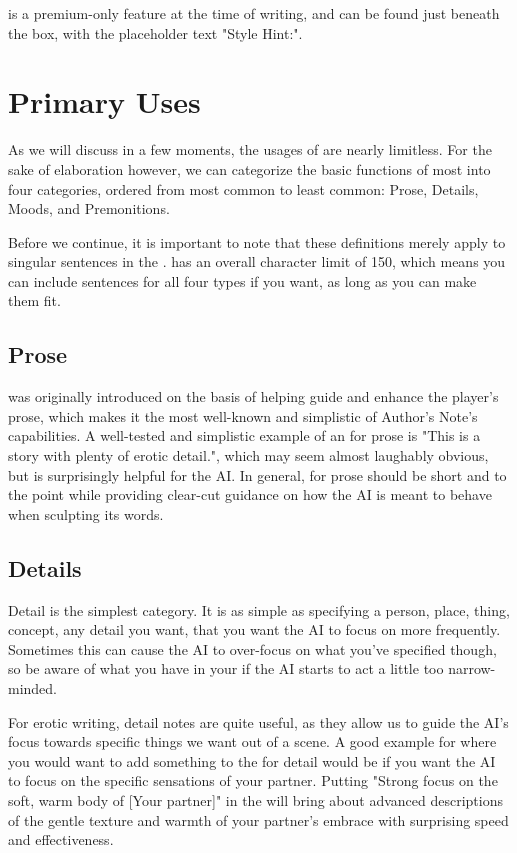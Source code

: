 ﻿\documentclass[Coomer-main.tex]{subfiles}
\begin{document}
\an is a premium-only feature at the time of writing, and can be found just beneath the \rem box, with the placeholder text "Style Hint:".

\section{Primary Uses}

As we will discuss in a few moments, the usages of \an are nearly limitless.
For the sake of elaboration however, we can categorize the basic functions of most \ans into four categories, ordered from most common to least common: Prose, Details, Moods, and Premonitions.

Before we continue, it is important to note that these definitions merely apply to singular sentences in the \an. \an has an overall character limit of 150, which means you can include sentences for all four types if you want, as long as you can make them fit.

\subsection{Prose}

\an was originally introduced on the basis of helping guide and enhance the player's prose, which makes it the most well-known and simplistic of Author's Note's capabilities.
A well-tested and simplistic example of an \an for prose is "This is a story with plenty of erotic detail.", which may seem almost laughably obvious, but is surprisingly helpful for the AI.
In general, \ans for prose should be short and to the point while providing clear-cut guidance on how the AI is meant to behave when sculpting its words.

\subsection{Details}

Detail is the simplest \an category.
It is as simple as specifying a person, place, thing, concept, any detail you want, that you want the AI to focus on more frequently.
Sometimes this can cause the AI to over-focus on what you've specified though, so be aware of what you have in your \an if the AI starts to act a little too narrow-minded.

For erotic writing, detail notes are quite useful, as they allow us to guide the AI's focus towards specific things we want out of a scene.
A good example for where you would want to add something to the \an for detail would be if you want the AI to focus on the specific sensations of your partner.
Putting "Strong focus on the soft, warm body of [Your partner]" in the \an will bring about advanced descriptions of the gentle texture and warmth of your partner’s embrace with surprising speed and effectiveness.
\end{document}
